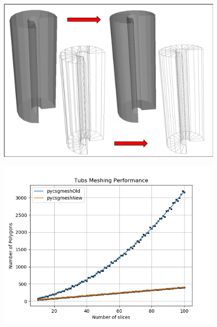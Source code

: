 \documentclass[12pt,a4paper]{article}
\begin{document}
\begin{figure}[h!]
\centering
\begin{minipage}{.2\textwidth}
  \centering
  \includegraphics[height=0.7\linewidth]{Images//Meshes//tubs.png}
  \label{fig:test1}
\end{minipage}%
\begin{minipage}{.3\textwidth}
  \centering
  \includegraphics[scale=0.35]{Images//Quad_fits//Tubs_quad.png}
  \label{fig:test2}
\end{minipage}%
\end{figure}

\endgroup
\end{document}
